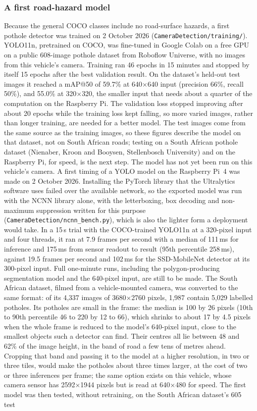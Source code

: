 \subsubsection*{A first road-hazard model}
Because the general COCO classes include no road-surface hazards, a first pothole detector was trained on 2 October 2026 (\texttt{CameraDetection/training/}). YOLO11n, pretrained on COCO, was fine-tuned in Google Colab on a free GPU on a public 608-image pothole dataset from Roboflow Universe, with no images from this vehicle's camera. Training ran 46 epochs in 15 minutes and stopped by itself 15 epochs after the best validation result. On the dataset's held-out test images it reached a mAP@50 of 59.7\% at 640$\times$640 input (precision 66\%, recall 50\%), and 55.0\% at 320$\times$320, the smaller input that needs about a quarter of the computation on the Raspberry Pi. The validation loss stopped improving after about 20 epochs while the training loss kept falling, so more varied images, rather than longer training, are needed for a better model. The test images come from the same source as the training images, so these figures describe the model on that dataset, not on South African roads; testing on a South African pothole dataset (Nienaber, Kroon and Booysen, Stellenbosch University) and on the Raspberry Pi, for speed, is the next step. The model has not yet been run on this vehicle's camera. A first timing of a YOLO model on the Raspberry Pi~4 was made on 2 October 2026. Installing the PyTorch library that the Ultralytics software uses failed over the available network, so the exported model was run with the NCNN library alone, with the letterboxing, box decoding and non-maximum suppression written for this purpose (\texttt{CameraDetection/ncnn\_bench.py}), which is also the lighter form a deployment would take. In a 15\,s trial with the COCO-trained YOLO11n at a 320-pixel input and four threads, it ran at 7.9 frames per second with a median of 111\,ms for inference and 175\,ms from sensor readout to result (95th percentile 258\,ms), against 19.5 frames per second and 102\,ms for the SSD-MobileNet detector at its 300-pixel input. Full one-minute runs, including the polygon-producing segmentation model and the 640-pixel input, are still to be made. The South African dataset, filmed from a vehicle-mounted camera, was converted to the same format: of its 4,337 images of 3680$\times$2760 pixels, 1,987 contain 5,029 labelled potholes. Its potholes are small in the frame: the median is 100 by 26 pixels (10th to 90th percentile 46 to 220 by 12 to 66), which shrinks to about 17 by 4.5 pixels when the whole frame is reduced to the model's 640-pixel input, close to the smallest objects such a detector can find. Their centres all lie between 48 and 62\% of the image height, in the band of road a few tens of metres ahead. Cropping that band and passing it to the model at a higher resolution, in two or three tiles, would make the potholes about three times larger, at the cost of two or three inferences per frame; the same option exists on this vehicle, whose camera sensor has 2592$\times$1944 pixels but is read at 640$\times$480 for speed. The first model was then tested, without retraining, on the South African dataset's 605 test 